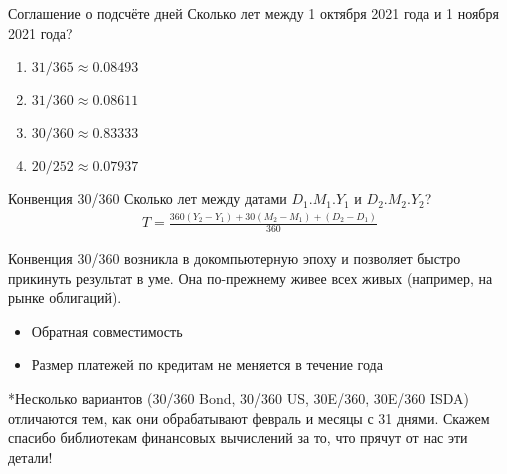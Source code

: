 \documentclass{beamer}
\begin{document}
\begin{frame}{Соглашение о подсчёте дней}
\justify
Сколько лет между 1 октября 2021 года и 1 ноября 2021 года?
\begin{enumerate}[label=\Alph*]
\item $31/365 \approx 0.08493$ 
\item $31/360 \approx 0.08611$ 
\item $30/360 \approx 0.83333$ 
\item $20/252 \approx 0.07937$ 
\end{enumerate}

\vspace{\baselineskip}
\end{frame}



\begin{frame}{Конвенция 30/360}
\justify
Сколько лет между датами $D_1.M_1.Y_1$ и $D_2.M_2.Y_2$?
\begin{align*}
T = \frac{360(Y_2-Y_1) + 30(M_2-M_1) + (D_2-D_1)}{360}
\end{align*}

\justify
Конвенция 30/360 возникла в докомпьютерную эпоху и позволяет быстро прикинуть результат в уме. Она по-прежнему живее всех живых (например, на рынке облигаций).
\begin{itemize}
\item Обратная совместимость
\item Размер платежей по кредитам не меняется в течение года
\end{itemize}

\vspace{\baselineskip}
\justify
*Несколько вариантов (30/360 Bond, 30/360 US, 30E/360, 30E/360 ISDA) отличаются тем, как они обрабатывают февраль и месяцы с 31 днями. Скажем спасибо библиотекам финансовых вычислений за то, что прячут от нас эти детали!
\end{frame}
\end{document}
